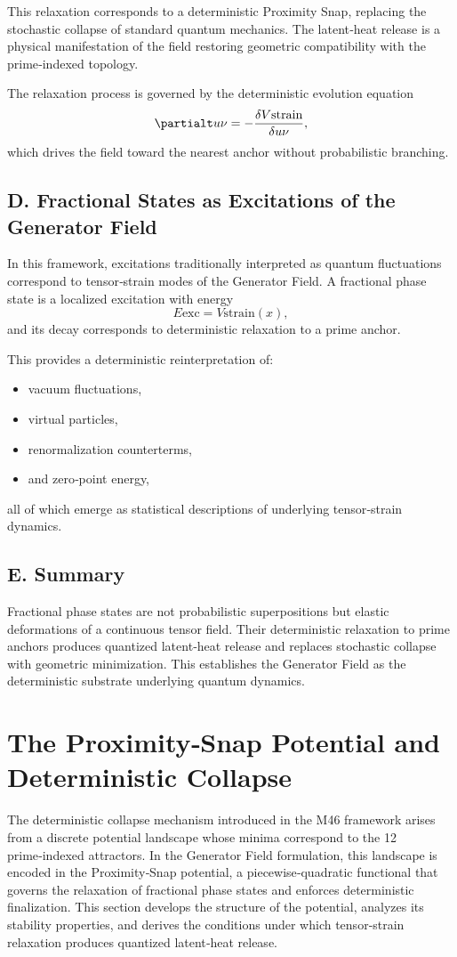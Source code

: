 \documentclass[reprint,amsmath,amssymb,aps,prl,floatfix]{revtex4-2}
\begin{document}
This relaxation corresponds to a deterministic Proximity Snap, replacing the stochastic collapse of standard quantum mechanics. The latent‑heat release is a physical manifestation of the field restoring geometric compatibility with the prime‑indexed topology.
\medskip

The relaxation process is governed by the deterministic evolution equation  
\[
\partialt u\nu = -\frac{\delta V{\mathrm{strain}}}{\delta u\nu},
\]  
which drives the field toward the nearest anchor without probabilistic branching.

\subsection{D. Fractional States as Excitations of the Generator Field}

In this framework, excitations traditionally interpreted as quantum fluctuations correspond to tensor‑strain modes of the Generator Field. A fractional phase state is a localized excitation with energy  
\[
E{\mathrm{exc}} = V{\mathrm{strain}}(x),
\]  
and its decay corresponds to deterministic relaxation to a prime anchor.

This provides a deterministic reinterpretation of:
\begin{itemize}
\item vacuum fluctuations,  
\item virtual particles,  
\item renormalization counterterms,  
\item and zero‑point energy,  
\end{itemize}

all of which emerge as statistical descriptions of underlying tensor‑strain dynamics.

\subsection{E. Summary}

Fractional phase states are not probabilistic superpositions but elastic deformations of a continuous tensor field. Their deterministic relaxation to prime anchors produces quantized latent‑heat release and replaces stochastic collapse with geometric minimization. This establishes the Generator Field as the deterministic substrate underlying quantum dynamics.

\section{The Proximity‑Snap Potential and Deterministic Collapse}
The deterministic collapse mechanism introduced in the M46 framework arises from a discrete potential landscape whose minima correspond to the 12 prime‑indexed attractors. In the Generator Field formulation, this landscape is encoded in the Proximity‑Snap potential, a piecewise‑quadratic functional that governs the relaxation of fractional phase states and enforces deterministic finalization. This section develops the structure of the potential, analyzes its stability properties, and derives the conditions under which tensor‑strain relaxation produces quantized latent‑heat release.
\end{document}
